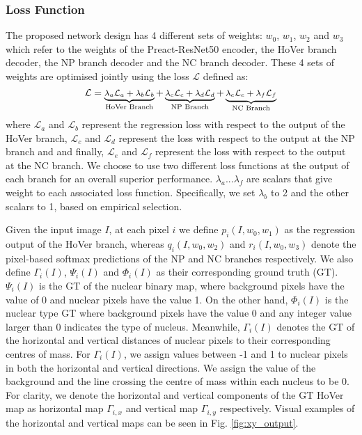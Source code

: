 \documentclass[journal]{IEEEtran}
\begin{document}
	\subsubsection{Loss Function} \label{section:loss}
	
	The proposed network design has 4 different sets of weights: $w_0$, $w_1$,  $w_2$ and $w_3$ which refer to the weights of the Preact-ResNet50 encoder, the HoVer branch decoder, the NP branch decoder and the NC branch decoder. These 4 sets of weights are optimised jointly using the loss $\mathcal{L}$ defined as:
\begin{equation}
    	\small
    	\mathcal{L} = 
    	    \underbrace{\lambda_a\mathcal{L}_{a} + \lambda_b\mathcal{L}_{b}}_{\text{HoVer Branch}}
	      + \underbrace{\lambda_c\mathcal{L}_{c} + \lambda_d\mathcal{L}_{d}}_{\text{NP Branch}}
	      + \underbrace{\lambda_e\mathcal{L}_{e} + \lambda_f\mathcal{L}_{f}}_{\text{NC Branch}}
	\end{equation}
	\noindent where $\mathcal{L}_{a}$ and $\mathcal{L}_{b}$ represent the regression loss with respect to the output of the HoVer branch, $\mathcal{L}_{c}$ and $\mathcal{L}_{d}$ represent the loss with respect to the output at the NP branch and and finally, $\mathcal{L}_{e}$ and $\mathcal{L}_{f}$ represent the loss with respect to the output at the NC branch. We choose to use two different loss functions at the output of each branch for an overall superior performance. $\lambda_a ... \lambda_f$ are scalars that give weight to each associated loss function. Specifically, we set $\lambda_b$ to 2 and the other scalars to 1, based on empirical selection.
	
	
	Given the input image $I$, at each pixel $i$ we define $p_i(I, w_0, w_1)$ as the regression output of the HoVer branch, whereas $q_i(I, w_0, w_2)$ and $r_i(I, w_0, w_3)$ denote the pixel-based softmax predictions of the NP and NC branches respectively. We also define $\Gamma_i(I)$, $\Psi_i(I)$ and $\Phi_i(I)$ as their corresponding ground truth (GT). $\Psi_i(I)$ is the GT of the nuclear binary map, where background pixels have the value of 0 and nuclear pixels have the value 1. On the other hand, $\Phi_i(I)$ is the nuclear type GT where background pixels have the value 0 and any integer value larger than 0 indicates the type of nucleus. Meanwhile, $\Gamma_i(I)$ denotes the GT of the horizontal and vertical distances of nuclear pixels to their corresponding centres of mass. For $\Gamma_i(I)$, we assign values between -1 and 1 to nuclear pixels in both the horizontal and vertical directions. We assign the value of the background and the line crossing the centre of mass within each nucleus to be 0. For clarity, we denote the horizontal and vertical components of the GT HoVer map as horizontal map $\Gamma _{i,x}$ and vertical map $\Gamma _{i,y}$ respectively. Visual examples of the horizontal and vertical maps can be seen in Fig. \ref{fig:xy_output}.
	
\end{document}
